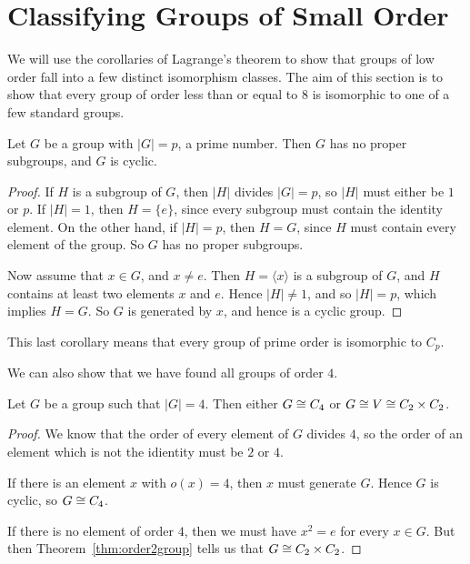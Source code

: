 \section{Classifying Groups of Small Order}

We will use the corollaries of Lagrange's theorem to show that groups 
of low order fall into a few distinct isomorphism classes.  The aim of 
this section is to show that every group of order less than or equal 
to $8$ is isomorphic to one of a few standard groups.

\begin{corollary}
  Let $G$ be a group with $|G| = p$, a prime number.  Then $G$ has no 
  proper subgroups, and $G$ is cyclic.
\end{corollary}
\begin{proof}
  If $H$ is a subgroup of $G$, then $|H|$ divides $|G| = p$, so $|H|$ 
  must either be $1$ or $p$.  If $|H| = 1$, then $H = \{e\}$, since 
  every subgroup must contain the identity element.  On the other 
  hand, if $|H| = p$, then $H = G$, since $H$ must contain every 
  element of the group.  So $G$ has no proper subgroups.
  
  Now assume that $x \in G$, and $x \ne e$.  Then $H = \langle x
  \rangle$ is a subgroup of $G$, and $H$ contains at least two
  elements $x$ and $e$.  Hence $|H| \ne 1$, and so $|H| = p$, which 
  implies $H = G$.  So $G$ is generated by $x$, and hence is a cyclic 
  group.
\end{proof}

This last corollary means that every group of prime order is 
isomorphic to $C_{p}$.

We can also show that we have found all groups of order $4$.

\begin{proposition}
  Let $G$ be a group such that $|G| = 4$.  Then either $G \cong 
  C_{4}$ or $G \cong V \cong C_{2} \times C_{2}$.
\end{proposition}
\begin{proof}
  We know that the order of every element of $G$ divides $4$, so the 
  order of an element which is not the idientity must be $2$ or $4$.
  
  If there is an element $x$ with $o(x) = 4$, then $x$ must generate 
  $G$.  Hence $G$ is cyclic, so $G \cong C_{4}$.
  
  If there is no element of order $4$, then we must have $x^{2} = e$ 
  for every $x \in G$.  But then Theorem~\ref{thm:order2group} tells 
  us that $G \cong C_{2} \times C_{2}$.
\end{proof}

